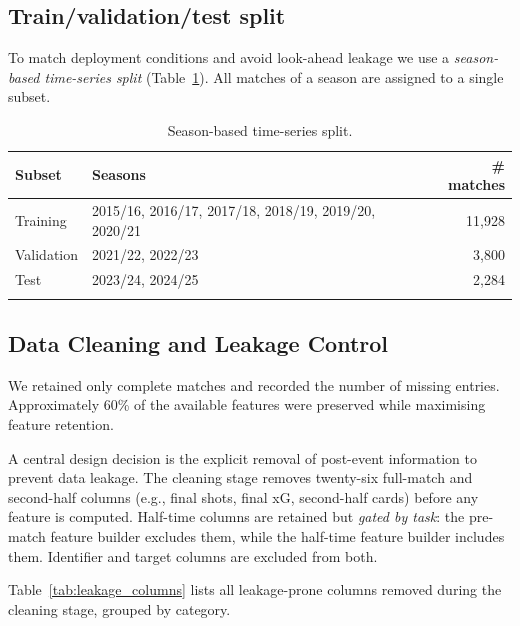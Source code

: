 \documentclass[pdflatex,sn-mathphys-num]{sn-jnl}
\theoremstyle{thmstyleone}
\theoremstyle{thmstyletwo}
\theoremstyle{thmstylethree}
\begin{document}
\subsection{Train/validation/test split}\label{subsec:split}

To match deployment conditions and avoid look-ahead leakage we use a
\emph{season-based time-series split} (Table~\ref{tab:split}). All matches
of a season are assigned to a single subset.

\begin{table}[h]
\caption{Season-based time-series split.}\label{tab:split}
\begin{tabular}{@{}llr@{}}
\toprule
Subset      & Seasons                            & \# matches \\
\midrule
Training    & 2015/16, 2016/17, 2017/18, 2018/19, 2019/20, 2020/21 & 11,928 \\
Validation  & 2021/22, 2022/23                   & 3,800 \\
Test        & 2023/24, 2024/25                          & 2,284 \\
\botrule
\end{tabular}
\end{table}

\subsection{Data Cleaning and Leakage Control}
\label{subsec:leakage}

We retained only complete matches and recorded the number of missing entries. Approximately 60\% of the available features were preserved while maximising feature retention.

A central design decision is the explicit removal of post-event information to prevent data leakage. The cleaning stage removes twenty-six full-match and second-half columns (e.g., final shots, final xG, second-half cards) before any feature is computed. Half-time columns are retained but \emph{gated by task}: the pre-match feature builder excludes them, while the half-time feature builder includes them. Identifier and target columns are excluded from both.

Table~\ref{tab:leakage_columns} lists all leakage-prone columns removed during the cleaning stage, grouped by category.
\end{document}
